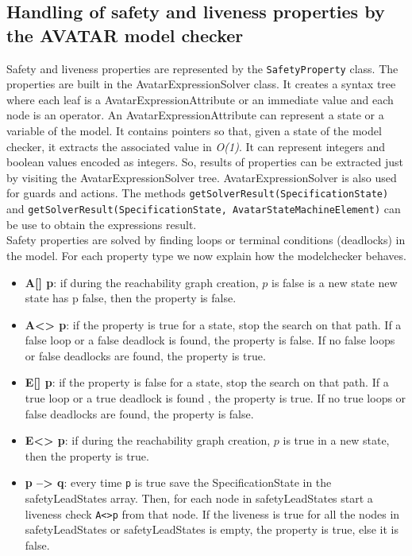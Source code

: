 \documentclass[12pt]{article}
\begin{document}
\subsection{Handling of safety and liveness properties by the AVATAR model checker}
Safety and liveness properties are represented by the \texttt{SafetyProperty} class. The properties are built in the AvatarExpressionSolver class. It creates a syntax tree where each leaf is a AvatarExpressionAttribute or an immediate value and each node is an operator. An AvatarExpressionAttribute can represent a state or a variable of the model. It contains pointers so that, given a state of the model checker, it extracts the associated value in \textit{O(1)}. It can represent integers and boolean values encoded as integers. So, results of properties can be extracted just by visiting the AvatarExpressionSolver tree. AvatarExpressionSolver is also used for guards and actions. The methods \texttt{getSolverResult(SpecificationState)} and \texttt{getSolverResult(SpecificationState, AvatarStateMachineElement)} can be use to obtain the expressions result.\\

Safety properties are solved by finding loops or terminal conditions (deadlocks) in the model. For each property type we now explain how the modelchecker behaves.
\begin{itemize}
	\item \textbf{A[] p}: if during the reachability graph creation, $p$ is false is a new state new state has p false, then the property is false.
	\item \textbf{A<> p}: if the property is true for a state, stop the search on that path. If a false loop or a false deadlock is found, the property is false. If no false loops or false deadlocks are found, the property is true.
	\item \textbf{E[] p}:  if the property is false for a state, stop the search on that path. If a true loop or a true deadlock is found , the property is true. If no true loops or false deadlocks are found, the property is false.
	\item \textbf{E<> p}:  if during the reachability graph creation, $p$ is true in a new state,  then the property is true.
	\item \textbf{p --> q}: every time \texttt{p} is true save the SpecificationState in the safetyLeadStates array. Then, for each node in safetyLeadStates start a liveness check \texttt{A<>p} from that node. If the liveness is true for all the nodes in safetyLeadStates or safetyLeadStates is empty, the property is true, else it is false.
\end{itemize}
\end{document}
